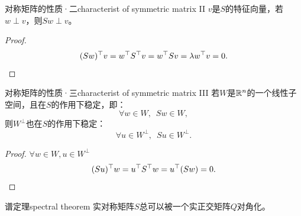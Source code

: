 \begin{theorem}{对称矩阵的性质·二}{characterist of symmetric matrix II}
	$v$是$S$的特征向量，若$w \perp v$，则$Sw \perp v$。
\end{theorem}
\begin{proof}
	
	\[
		(Sw)^\top v = w^\top S^\top v = w^\top Sv = \lambda w^\top v = 0.
		\qedhere
	\]
\end{proof}
\begin{theorem}{对称矩阵的性质·三}{characterist of symmetric matrix III}
	若$W$是$\mathbb{R}^n$的一个线性子空间，且在$S$的作用下稳定，即：
	\[
		\forall w \in W,\enspace Sw \in W,
	\]
	则$W^\perp$也在$S$的作用下稳定：
	\[
		\forall u \in W^\perp,\enspace Su \in W^\perp.
	\]
\end{theorem}
\begin{proof}
	$\forall w \in W,u \in W^\perp$
	\[
		(Su)^\top w = u^\top S^\top w = u^\top(Sw) = 0.
		\qedhere
	\]
\end{proof}
\begin{theorem}{谱定理}{spectral theorem}
	实对称矩阵$S$总可以被一个实正交矩阵$Q$对角化。
\end{theorem}
